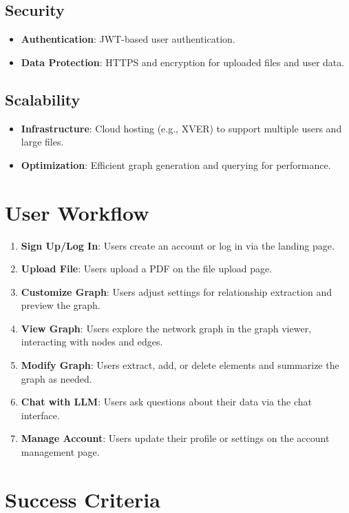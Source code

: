 \documentclass[%
 reprint,
 amsmath,amssymb,
 aps,
]{revtex4-2}
\begin{document}
\subsection{\label{sec:security}Security}
\begin{itemize}
\item \textbf{Authentication}: JWT-based user authentication.
\item \textbf{Data Protection}: HTTPS and encryption for uploaded files and user data.
\end{itemize}

\subsection{\label{sec:scalability}Scalability}
\begin{itemize}
\item \textbf{Infrastructure}: Cloud hosting (e.g., XVER) to support multiple users and large files.
\item \textbf{Optimization}: Efficient graph generation and querying for performance.
\end{itemize}

\section{\label{sec:user_workflow}User Workflow}

\begin{enumerate}
\item \textbf{Sign Up/Log In}: Users create an account or log in via the landing page.
\item \textbf{Upload File}: Users upload a PDF on the file upload page.
\item \textbf{Customize Graph}: Users adjust settings for relationship extraction and preview the graph.
\item \textbf{View Graph}: Users explore the network graph in the graph viewer, interacting with nodes and edges.
\item \textbf{Modify Graph}: Users extract, add, or delete elements and summarize the graph as needed.
\item \textbf{Chat with LLM}: Users ask questions about their data via the chat interface.
\item \textbf{Manage Account}: Users update their profile or settings on the account management page.
\end{enumerate}

\section{\label{sec:success_criteria}Success Criteria}
\end{document}
